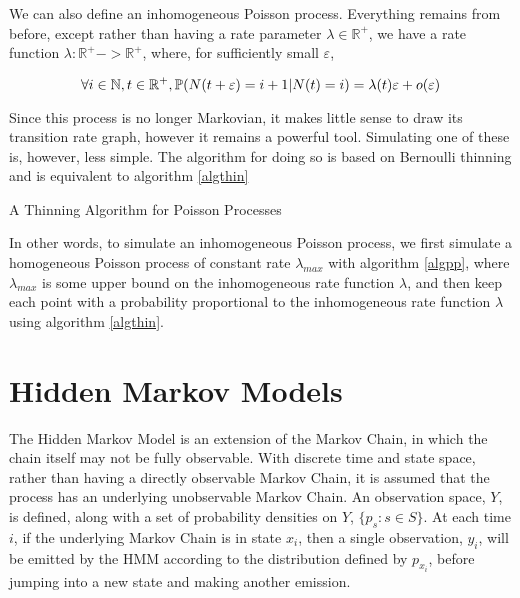 We can also define an inhomogeneous Poisson process. Everything remains from before, except rather than having a rate parameter $\lambda \in \mathbb{R}^{+}$, we have a rate function $\lambda : \mathbb{R}^{+} -> \mathbb{R}^{+}$, where, for sufficiently small $\varepsilon$,

$$
\forall i \in \mathbb{N}, t \in \mathbb{R}^{+}, \mathbb{P} (N(t+\varepsilon) = i+1 | N(t) = i) = \lambda(t) \varepsilon + o(\varepsilon)
$$

Since this process is no longer Markovian, it makes little sense to draw its transition rate graph, however it remains a powerful tool. Simulating one of these is, however, less simple. The algorithm for doing so is based on Bernoulli thinning \cite{thinning} and is equivalent to algorithm \ref{algthin}

\begin{algorithm}
\SetAlgoLined
{}

\caption{A Thinning Algorithm for Poisson Processes}\label{algthin}

\end{algorithm}

In other words, to simulate an inhomogeneous Poisson process, we first simulate a homogeneous Poisson process of constant rate $\lambda_{max}$ with algorithm \ref{algpp}, where $\lambda_{max}$ is some upper bound on the inhomogeneous rate function $\lambda$, and then keep each point with a probability proportional to the inhomogeneous rate function $\lambda$ using algorithm \ref{algthin}.

\section{Hidden Markov Models}

The Hidden Markov Model is an extension of the Markov Chain, in which the chain itself may not be fully observable. With discrete time and state space, rather than having a directly observable Markov Chain, it is assumed that the process has an underlying unobservable Markov Chain. An observation space, $Y$, is defined, along with a set of probability densities on $Y$, $\{p_s : s \in S\}$. At each time $i$, if the underlying Markov Chain is in state $x_i$, then a single observation, $y_i$, will be emitted by the HMM according to the distribution defined by $p_{x_i}$, before jumping into a new state and making another emission.

